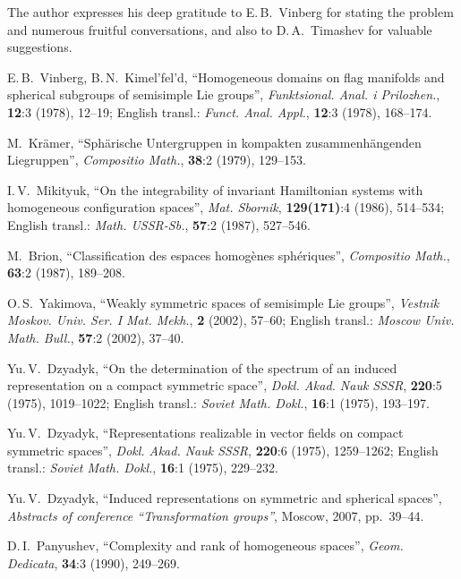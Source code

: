 \documentclass[12pt]{amsart}
\theoremstyle{definition}
\theoremstyle{remark}
\begin{document}
The author expresses his deep gratitude to E.\,B.~Vinberg for
stating the problem and numerous fruitful conversations, and also to
D.\,A.~Timashev for valuable suggestions.

\begin{thebibliography}{99}

\setlength{\itemsep}{-\parsep}

E.\,B.~Vinberg, B.\,N.~Kimel'fel'd, ``Homogeneous domains on flag
manifolds and spherical subgroups of semisimple Lie groups'',
\emph{Funktsional. Anal. i Prilozhen.}, \textbf{12}:3 (1978),
12--19; English transl.: \emph{Funct. Anal. Appl.}, \textbf{12}:3
(1978), 168--174.

M.~Kr\"amer, ``Sph\"arische Untergruppen in kompakten
zusammenh\"angenden Liegruppen'', \emph{Compositio Math.},
\textbf{38}:2 (1979), 129--153.

I.\,V.~Mikityuk, ``On the integrability of invariant Hamiltonian
systems with homogeneous configuration spaces'', \emph{Mat.
Sbornik}, \textbf{129(171)}:4 (1986), 514--534; English transl.:
\emph{Math. USSR-Sb.}, \textbf{57}:2 (1987), 527--546.

M.~Brion, ``Classification des espaces homog\`enes sph\'eriques'',
\emph{Compositio Math.}, \textbf{63}:2 (1987), 189--208.

O.\,S.~Yakimova, ``Weakly symmetric spaces of semisimple Lie
groups'', \emph{Vestnik Moskov. Univ. Ser. I Mat. Mekh.}, \textbf{2}
(2002), 57--60; English transl.: \emph{Moscow Univ. Math. Bull.},
\textbf{57}:2 (2002), 37--40.

Yu.\,V.~Dzyadyk, ``On the determination of the spectrum of an
induced representation on a compact symmetric space'', \emph{Dokl.
Akad. Nauk SSSR}, \textbf{220}:5 (1975), 1019--1022; English
transl.: \emph{Soviet Math. Dokl.}, \textbf{16}:1 (1975), 193--197.

Yu.\,V.~Dzyadyk, ``Representations realizable in vector fields on
compact symmetric spaces'', \emph{Dokl. Akad. Nauk SSSR},
\textbf{220}:6 (1975), 1259--1262; English transl.: \emph{Soviet
Math. Dokl.}, \textbf{16}:1 (1975), 229--232.

Yu.\,V.~Dzyadyk, ``Induced representations on symmetric and
spherical spaces'', \emph{Abstracts of conference ``Transformation
groups''}, Moscow, 2007, pp.~39--44.

D.\,I.~Panyushev, ``Complexity and rank of homogeneous spaces'',
\emph{Geom. Dedicata}, \textbf{34}:3 (1990), 249--269.


\end{thebibliography}
\end{document}

